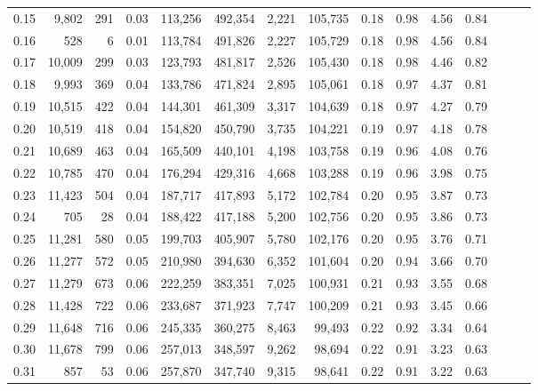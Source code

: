 \begin{tabular}{rrrrrrrrrrrrrrr}
0.15 &   9,802 &    291 &  0.03 &  113,256 &  492,354 &    2,221 &  105,735 &  0.18 &  0.98 &  4.56 &      0.84 \\
0.16 &     528 &      6 &  0.01 &  113,784 &  491,826 &    2,227 &  105,729 &  0.18 &  0.98 &  4.56 &      0.84 \\
0.17 &  10,009 &    299 &  0.03 &  123,793 &  481,817 &    2,526 &  105,430 &  0.18 &  0.98 &  4.46 &      0.82 \\
0.18 &   9,993 &    369 &  0.04 &  133,786 &  471,824 &    2,895 &  105,061 &  0.18 &  0.97 &  4.37 &      0.81 \\
0.19 &  10,515 &    422 &  0.04 &  144,301 &  461,309 &    3,317 &  104,639 &  0.18 &  0.97 &  4.27 &      0.79 \\
0.20 &  10,519 &    418 &  0.04 &  154,820 &  450,790 &    3,735 &  104,221 &  0.19 &  0.97 &  4.18 &      0.78 \\
0.21 &  10,689 &    463 &  0.04 &  165,509 &  440,101 &    4,198 &  103,758 &  0.19 &  0.96 &  4.08 &      0.76 \\
0.22 &  10,785 &    470 &  0.04 &  176,294 &  429,316 &    4,668 &  103,288 &  0.19 &  0.96 &  3.98 &      0.75 \\
0.23 &  11,423 &    504 &  0.04 &  187,717 &  417,893 &    5,172 &  102,784 &  0.20 &  0.95 &  3.87 &      0.73 \\
0.24 &     705 &     28 &  0.04 &  188,422 &  417,188 &    5,200 &  102,756 &  0.20 &  0.95 &  3.86 &      0.73 \\
0.25 &  11,281 &    580 &  0.05 &  199,703 &  405,907 &    5,780 &  102,176 &  0.20 &  0.95 &  3.76 &      0.71 \\
0.26 &  11,277 &    572 &  0.05 &  210,980 &  394,630 &    6,352 &  101,604 &  0.20 &  0.94 &  3.66 &      0.70 \\
0.27 &  11,279 &    673 &  0.06 &  222,259 &  383,351 &    7,025 &  100,931 &  0.21 &  0.93 &  3.55 &      0.68 \\
0.28 &  11,428 &    722 &  0.06 &  233,687 &  371,923 &    7,747 &  100,209 &  0.21 &  0.93 &  3.45 &      0.66 \\
0.29 &  11,648 &    716 &  0.06 &  245,335 &  360,275 &    8,463 &   99,493 &  0.22 &  0.92 &  3.34 &      0.64 \\
0.30 &  11,678 &    799 &  0.06 &  257,013 &  348,597 &    9,262 &   98,694 &  0.22 &  0.91 &  3.23 &      0.63 \\
0.31 &     857 &     53 &  0.06 &  257,870 &  347,740 &    9,315 &   98,641 &  0.22 &  0.91 &  3.22 &      0.63 \\

\end{tabular}
